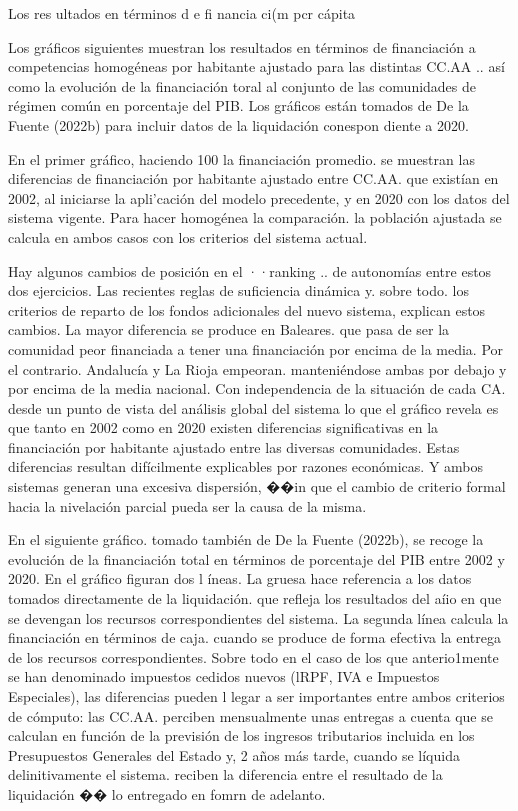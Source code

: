 \documentclass[10pt,a4paper]{article}
\begin{document}
Los res ultados en términos d e fi nancia ci(m pcr cápita

Los gráficos siguientes muestran los resultados en términos de financiación a competencias homogéneas por habitante ajustado para las distintas CC.AA .. así como la evolución de la financiación toral al conjunto de las comunidades de régimen común en porcentaje del PIB. Los gráficos están tomados de De la Fuente (2022b) para incluir datos de la liquidación conespon diente a 2020.

En el primer gráfico, haciendo 100 la financiación promedio. se muestran las diferencias de financiación por habitante ajustado entre CC.AA. que existían en 2002, al iniciarse la apli'cación del modelo precedente, y en 2020 con los datos del sistema vigente. Para hacer homogénea la comparación. la población ajustada se calcula en ambos casos con los criterios del sistema actual.

Hay algunos cambios de posición en el ··ranking .. de autonomías entre estos dos ejercicios. Las recientes reglas de suficiencia dinámica y. sobre todo. los criterios de reparto de los fondos adicionales del nuevo sistema, explican estos cambios. La mayor diferencia se produce en Baleares. que pasa de ser la comunidad peor financiada a tener una financiación por encima de la media. Por el contrario. Andalucía y La Rioja empeoran. manteniéndose ambas por debajo y por encima de la media nacional. Con independencia de la situación de cada CA. desde un punto de vista del análisis global del sistema lo que el gráfico revela es que tanto en 2002 como en 2020 existen diferencias significativas en la financiación por habitante ajustado entre las diversas comunidades. Estas diferencias resultan difícilmente explicables por razones económicas. Y ambos sistemas generan una excesiva dispersión, ��in que el cambio de criterio formal hacia la nivelación parcial pueda ser la causa de la misma.

En el siguiente gráfico. tomado también de De la Fuente (2022b), se recoge la evolución de la financiación total en términos de porcentaje del PIB entre 2002 y 2020. En el gráfico figuran dos l íneas. La gruesa hace referencia a los datos tomados directamente de la liquidación. que refleja los resultados del aíio en que se devengan los recursos correspondientes del sistema. La segunda línea calcula la financiación en términos de caja. cuando se produce de forma efectiva la entrega de los recursos correspondientes. Sobre todo en el caso de los que anterio1mente se han denominado impuestos cedidos nuevos (lRPF, IVA e Impuestos Especiales), las diferencias pueden l legar a ser importantes entre ambos criterios de cómputo: las CC.AA. perciben mensualmente unas entregas a cuenta que se calculan en función de la previsión de los ingresos tributarios incluida en los Presupuestos Generales del Estado y, 2 años más tarde, cuando se líquida delinitivamente el sistema. reciben la diferencia entre el resultado de la liquidación �� lo entregado en fomrn de adelanto.
\end{document}
